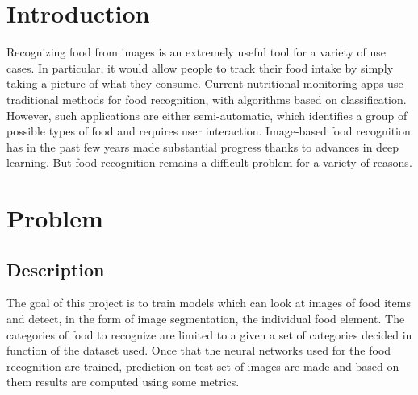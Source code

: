 \documentclass[a4paper,10pt]{report}
\begin{document}
{\let\clearpage\relax\par \chapter{Introduction}\label{chap:introduction}
Recognizing food from images is an extremely useful tool for a variety of use cases. In particular, it would allow people to track their food intake by simply taking a picture of what they consume. Current nutritional monitoring apps use traditional methods for food recognition, with algorithms based on classification. However, such applications are either semi-automatic, which identifies a
group of possible types of food and requires user interaction.
Image-based food recognition has in the past few years made substantial progress thanks to advances in deep learning. But food recognition remains a difficult problem for a variety of reasons.



\chapter{Problem}\label{chap:problem}

\section{Description}\label{sec:section-21}
The goal of this project is to train models which can look at images of food items and detect, in the form of image segmentation, the individual food element. The categories of food to recognize are limited to a given a set of categories decided in function of the dataset used. Once that the neural networks used for the food recognition are trained, prediction on test set of images are made and based on them results are computed using some metrics.


}
\end{document}
